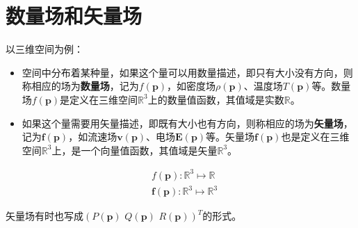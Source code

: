 \section{数量场和矢量场}

以三维空间为例：
\begin{itemize}
    \item 空间中分布着某种量，如果这个量可以用数量描述，即只有大小没有方向，则称相应的场为{\bf 数量场}，记为$f\left( \boldsymbol{p} \right) $，如密度场$\rho \left( \boldsymbol{p} \right) $、温度场$T\left( \boldsymbol{p} \right) $等。数量场$f\left( \boldsymbol{p} \right) $是定义在三维空间$\mathbb{R} ^3$上的数量值函数，其值域是实数$\mathbb{R} $。
    \item 如果这个量需要用矢量描述，即既有大小也有方向，则称相应的场为{\bf 矢量场}，记为$\boldsymbol{f}\left( \boldsymbol{p} \right) $，如流速场$\boldsymbol{v}\left( \boldsymbol{p} \right) $、电场$\boldsymbol{E}\left( \boldsymbol{p} \right) $等。矢量场$\boldsymbol{f}\left( \boldsymbol{p} \right) $也是定义在三维空间$\mathbb{R} ^3$上，是一个向量值函数，其值域是矢量$\mathbb{R} ^3$。
\end{itemize}
\begin{align*}
&f\left( \boldsymbol{p} \right) :\mathbb{R} ^3\mapsto \mathbb{R} \\
&\boldsymbol{f}\left( \boldsymbol{p} \right) :\mathbb{R} ^3\mapsto \mathbb{R} ^3
\end{align*}

矢量场有时也写成$\left( P\left( \boldsymbol{p} \right)\,\,Q\left( \boldsymbol{p} \right)\,\,R\left( \boldsymbol{p} \right) \right) ^T$的形式。




